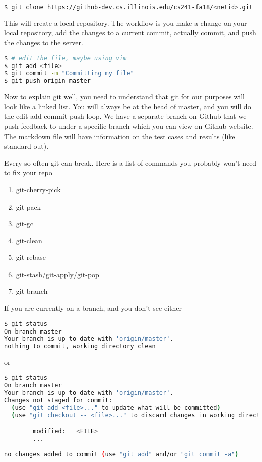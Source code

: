 \begin{lstlisting}[language=bash]
$ git clone https://github-dev.cs.illinois.edu/cs241-fa18/<netid>.git
\end{lstlisting}

This will create a local repository. The workflow is you make a change on your local repository, add the changes to a current commit, actually commit, and push the changes to the server.

\begin{lstlisting}[language=bash]
$ # edit the file, maybe using vim
$ git add <file>
$ git commit -m "Committing my file"
$ git push origin master
\end{lstlisting}

Now to explain git well, you need to understand that git for our purposes will look like a linked list.
You will always be at the head of master, and you will do the edit-add-commit-push loop. We have a separate branch on Github that we push feedback to under a specific branch which you can view on Github website. The markdown file will have information on the test cases and results (like standard out).

Every so often git can break. Here is a list of commands you probably won't need to fix your repo

\begin{enumerate}
\item git-cherry-pick
\item git-pack
\item git-gc
\item git-clean
\item git-rebase
\item git-stash/git-apply/git-pop
\item git-branch
\end{enumerate}

If you are currently on a branch, and you don't see either

\begin{lstlisting}[language=bash]
$ git status
On branch master
Your branch is up-to-date with 'origin/master'.
nothing to commit, working directory clean
\end{lstlisting}

or

\begin{lstlisting}[language=bash]
$ git status
On branch master
Your branch is up-to-date with 'origin/master'.
Changes not staged for commit:
  (use "git add <file>..." to update what will be committed)
  (use "git checkout -- <file>..." to discard changes in working directory)

        modified:   <FILE>
        ...

no changes added to commit (use "git add" and/or "git commit -a")
\end{lstlisting}

